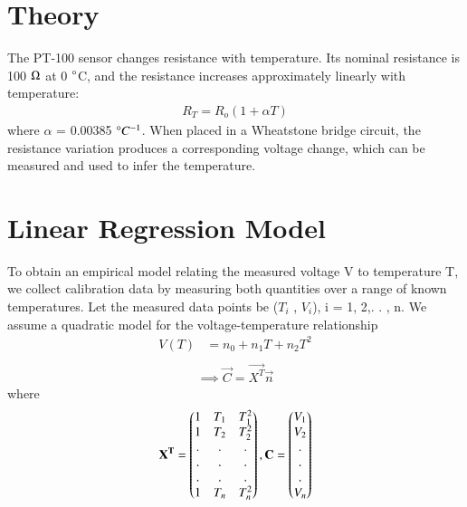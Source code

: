 \documentclass[journal,12pt,onecolumn]{IEEEtran}
\begin{document}
\vspace{2cm}

\section{\textbf{Theory}}
The PT-100 sensor changes resistance with temperature. Its nominal resistance is 100 $\ohm$
at 0 $\degree$C, and the resistance increases approximately linearly with temperature:
\begin{align}
R_T = R_o(1 + \alpha T)
\end{align}
where $\alpha$ = 0.00385 $\degree C^{-1}$. When placed in a Wheatstone bridge circuit, the resistance variation produces a corresponding voltage change, which can be measured and used to infer the temperature.


\section{\textbf{Linear Regression Model}}
To obtain an empirical model relating the measured voltage V to temperature T, we collect calibration data by measuring both quantities over a range of known temperatures. Let the measured data points be ($T_i$ , $V_i$), i = 1, 2,. . , n. We assume a quadratic model for the voltage-temperature relationship
\begin{align}
    V(T) &= n_0+n_1T+n_2T^2 \\
\end{align}
\begin{align}
    \implies \vec{C} = \vec{X^T}\vec{n}  \label{eq:model}
\end{align}
where
\begin{align}
   \mathbf{X^T} = \begin{pmatrix}1 & T_1 & T_1^2 \\ 1 & T_2 & T_2^2 \\ . & . & .\\ . & . & .\\ . & . & . \\ 1 & T_n & T_n^2\end{pmatrix}, \mathbf{C} = \begin{pmatrix}V_1 \\ V_2 \\ . \\ . \\ . \\ V_n\end{pmatrix}
    \label{eq:x-y-theta-def}
\end{align}
\end{document}
